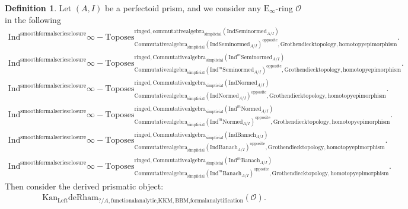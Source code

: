 \documentclass[11pt]{book}
\theoremstyle{definition}
\newtheorem{definition}[theorem]{Definition}
\numberwithin{equation}{section}
\begin{document}
\begin{definition}
Let $(A,I)$ be a perfectoid prism, and we consider any $\mathrm{E}_\infty$-ring $\mathcal{O}$ in the following
\begin{align}
\mathrm{Ind}^\text{smoothformalseriesclosure}\infty-\mathrm{Toposes}^{\mathrm{ringed},\mathrm{commutativealgebra}_{\mathrm{simplicial}}(\mathrm{Ind}\mathrm{Seminormed}_{A/I})}_{\mathrm{Commutativealgebra}_{\mathrm{simplicial}}(\mathrm{Ind}\mathrm{Seminormed}_{A/I})^\mathrm{opposite},\mathrm{Grothendiecktopology,homotopyepimorphism}}. \\
\mathrm{Ind}^\text{smoothformalseriesclosure}\infty-\mathrm{Toposes}^{\mathrm{ringed},\mathrm{Commutativealgebra}_{\mathrm{simplicial}}(\mathrm{Ind}^m\mathrm{Seminormed}_{A/I})}_{\mathrm{Commutativealgebra}_{\mathrm{simplicial}}(\mathrm{Ind}^m\mathrm{Seminormed}_{A/I})^\mathrm{opposite},\mathrm{Grothendiecktopology,homotopyepimorphism}}.\\
\mathrm{Ind}^\text{smoothformalseriesclosure}\infty-\mathrm{Toposes}^{\mathrm{ringed},\mathrm{Commutativealgebra}_{\mathrm{simplicial}}(\mathrm{Ind}\mathrm{Normed}_{A/I})}_{\mathrm{Commutativealgebra}_{\mathrm{simplicial}}(\mathrm{Ind}\mathrm{Normed}_{A/I})^\mathrm{opposite},\mathrm{Grothendiecktopology,homotopyepimorphism}}.\\
\mathrm{Ind}^\text{smoothformalseriesclosure}\infty-\mathrm{Toposes}^{\mathrm{ringed},\mathrm{Commutativealgebra}_{\mathrm{simplicial}}(\mathrm{Ind}^m\mathrm{Normed}_{A/I})}_{\mathrm{Commutativealgebra}_{\mathrm{simplicial}}(\mathrm{Ind}^m\mathrm{Normed}_{A/I})^\mathrm{opposite},\mathrm{Grothendiecktopology,homotopyepimorphism}}.\\
\mathrm{Ind}^\text{smoothformalseriesclosure}\infty-\mathrm{Toposes}^{\mathrm{ringed},\mathrm{Commutativealgebra}_{\mathrm{simplicial}}(\mathrm{Ind}\mathrm{Banach}_{A/I})}_{\mathrm{Commutativealgebra}_{\mathrm{simplicial}}(\mathrm{Ind}\mathrm{Banach}_{A/I})^\mathrm{opposite},\mathrm{Grothendiecktopology,homotopyepimorphism}}.\\
\mathrm{Ind}^\text{smoothformalseriesclosure}\infty-\mathrm{Toposes}^{\mathrm{ringed},\mathrm{Commutativealgebra}_{\mathrm{simplicial}}(\mathrm{Ind}^m\mathrm{Banach}_{A/I})}_{\mathrm{Commutativealgebra}_{\mathrm{simplicial}}(\mathrm{Ind}^m\mathrm{Banach}_{A/I})^\mathrm{opposite},\mathrm{Grothendiecktopology,homotopyepimorphism}}. 
\end{align}
Then consider the derived prismatic object:
\begin{align}
\mathrm{Kan}_{\mathrm{Left}}\mathrm{deRham}_{?/A,\text{functionalanalytic,KKM},\text{BBM,formalanalytification}}(\mathcal{O}).

\end{align}
\end{definition}
\end{document}
